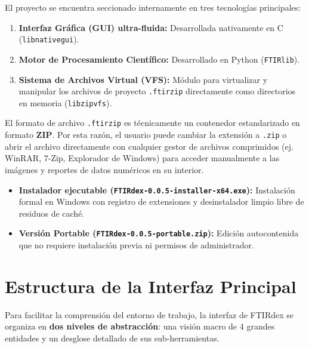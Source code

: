 \documentclass[11pt,a4paper]{article}
\begin{document}
El proyecto se encuentra seccionado internamente en tres tecnologías principales:

\begin{enumerate}[leftmargin=*,label=\textbf{\arabic*.}]
    \item \textbf{Interfaz Gráfica (GUI) ultra-fluida:} Desarrollada nativamente en C (\texttt{libnativegui}).
    \item \textbf{Motor de Procesamiento Científico:} Desarrollado en Python (\texttt{FTIRlib}).
    \item \textbf{Sistema de Archivos Virtual (VFS):} Módulo para virtualizar y manipular los archivos de proyecto \texttt{.ftirzip} directamente como directorios en memoria (\texttt{libzipvfs}).
\end{enumerate}

\begin{tcolorbox}[colback=yellow!5!white,colframe=orange!80!black,title=\textbf{Aclaración sobre el Formato de Proyecto (.ftirzip)}]
El formato de archivo \texttt{.ftirzip} es técnicamente un contenedor estandarizado en formato \textbf{ZIP}. Por esta razón, el usuario puede cambiar la extensión a \texttt{.zip} o abrir el archivo directamente con cualquier gestor de archivos comprimidos (ej. WinRAR, 7-Zip, Explorador de Windows) para acceder manualmente a las imágenes y reportes de datos numéricos en su interior.
\end{tcolorbox}

\begin{tcolorbox}[colback=blue!5!white,colframe=mainblue,title=\textbf{Modalidades de Distribución}]
\begin{itemize}[leftmargin=*]
    \item \textbf{Instalador ejecutable (\texttt{FTIRdex-0.0.5-installer-x64.exe}):} Instalación formal en Windows con registro de extensiones y desinstalador limpio libre de residuos de caché.
    \item \textbf{Versión Portable (\texttt{FTIRdex-0.0.5-portable.zip}):} Edición autocontenida que no requiere instalación previa ni permisos de administrador.
\end{itemize}
\end{tcolorbox}

\section{Estructura de la Interfaz Principal}

Para facilitar la comprensión del entorno de trabajo, la interfaz de FTIRdex se organiza en \textbf{dos niveles de abstracción}: una visión macro de 4 grandes entidades y un desglose detallado de sus sub-herramientas.
\end{document}
